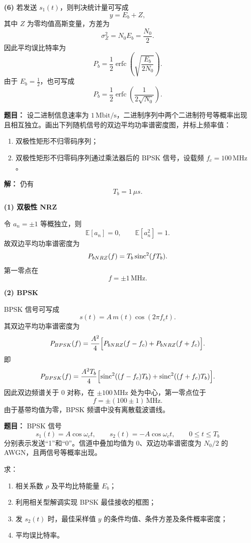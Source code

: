 \textbf{(6)} 若发送 $s_1(t)$，则判决统计量可写成
\[
y=E_b+Z,
\]
其中 $Z$ 为零均值高斯变量，方差为
\[
\sigma_Z^2=N_0E_b=\frac{N_0}{2}.
\]
因此平均误比特率为
\[
P_b=\frac12\operatorname{erfc}\!\left(\sqrt{\frac{E_b}{2N_0}}\right).
\]
由于 $E_b=\frac12$，也可写成
\[
P_b=\frac12\operatorname{erfc}\!\left(\frac{1}{2\sqrt{N_0}}\right).
\]

\medskip
{}
\textbf{题目：}
设二进制信息速率为 $1\,\mathrm{Mbit/s}$，二进制序列中两个二进制符号等概率出现且相互独立。画出下列随机信号的双边平均功率谱密度图，并标上频率值：
\begin{enumerate}
\item 双极性矩形不归零码序列；
\item 双极性矩形不归零码序列通过乘法器后的 BPSK 信号，设载频 $f_c=100\,\mathrm{MHz}$。
\end{enumerate}

\par\textbf{解：}
仍有
\[
T_b=1\,\mu s.
\]

\textbf{(1) 双极性 NRZ}\par
令 $a_n=\pm1$ 等概独立，则
\[
\mathbb{E}[a_n]=0,\qquad \mathbb{E}[a_n^2]=1.
\]
故双边平均功率谱密度为
\[
P_{bNRZ}(f)=T_b\operatorname{sinc}^2(fT_b).
\]
第一零点在
\[
f=\pm1\,\mathrm{MHz}.
\]

\textbf{(2) BPSK}\par
BPSK 信号可写成
\[
s(t)=A\,m(t)\cos(2\pi f_ct).
\]
其双边平均功率谱密度为
\[
P_{BPSK}(f)=\frac{A^2}{4}\Bigl[P_{bNRZ}(f-f_c)+P_{bNRZ}(f+f_c)\Bigr].
\]
即
\[
P_{BPSK}(f)=\frac{A^2T_b}{4}
\Bigl[
\operatorname{sinc}^2((f-f_c)T_b)+\operatorname{sinc}^2((f+f_c)T_b)
\Bigr].
\]
因此双边频谱关于 $0$ 对称，在 $\pm100\,\mathrm{MHz}$ 处为中心，第一零点位于
\[
f=\pm(100\pm1)\,\mathrm{MHz}.
\]
由于基带均值为零，BPSK 频谱中没有离散载波谱线。

\medskip
{}
\textbf{题目：}
BPSK 信号
\[
s_1(t)=A\cos\omega_ct,\qquad
s_2(t)=-A\cos\omega_ct,\qquad 0\le t\le T_b
\]
分别表示发送“1”和“0”。信道中叠加均值为 $0$、双边功率谱密度为 $N_0/2$ 的 AWGN，且两信号等概率出现。

求：
\begin{enumerate}
\item 相关系数 $\rho$ 及平均比特能量 $E_b$；
\item 利用相关型解调实现 BPSK 最佳接收的框图；
\item 发 $s_2(t)$ 时，最佳采样值 $y$ 的条件均值、条件方差及条件概率密度；
\item 平均误比特率。
\end{enumerate}

